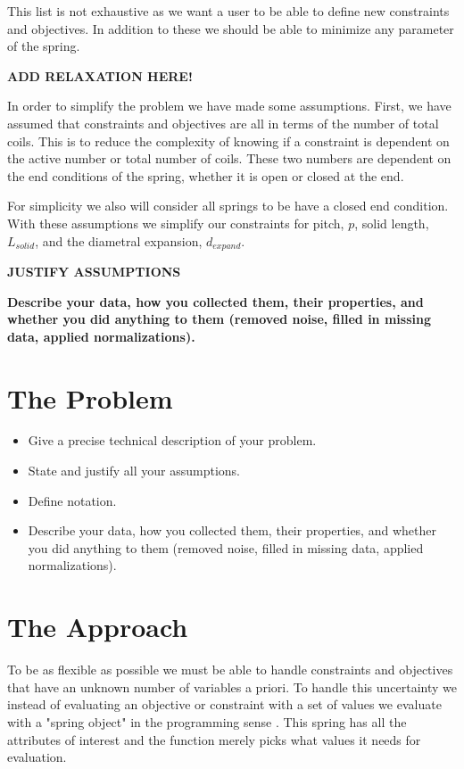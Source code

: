 \documentclass[10pt]{article}
\begin{document}
This list is not exhaustive as we want a user to be able to define new constraints and objectives. 
In addition to these we should be able to minimize any parameter of the spring. 


\textbf{ADD RELAXATION HERE!}




In order to simplify the problem we have made some assumptions. First, we have assumed that constraints and objectives are all in terms of the number of total coils. This is to reduce the complexity of knowing if a constraint is dependent on the active number or total number of coils. These two numbers are dependent on the end conditions of the spring, whether it is open or closed at the end. 

For simplicity we also will consider all springs to be have a closed end condition. With these assumptions we simplify our constraints for pitch, $p$, solid length, $L_{solid}$, and the diametral expansion, $d_{expand}$. 

\textbf{JUSTIFY ASSUMPTIONS}

\textbf{Describe your data, how you collected them, their properties,
and whether you did 
anything to them (removed noise, filled in missing data, 
applied normalizations).}

\section{The Problem}
\begin{itemize}
\item Give a precise technical description of your problem. 

\item State and justify all your assumptions. 

\item Define notation. 

\item Describe your data, how you collected them, their properties,
and whether you did 
anything to them (removed noise, filled in missing data, 
applied normalizations).
\end{itemize}


\section{The Approach}

To be as flexible as possible we must be able to handle constraints and objectives that have an unknown number of  variables a priori. To handle this uncertainty we instead of evaluating an objective or constraint with a set of values we evaluate with a "spring object" in the programming sense \cite{OOP}. This spring has all the attributes of interest and the function merely picks what values it needs for evaluation. 
\end{document}
